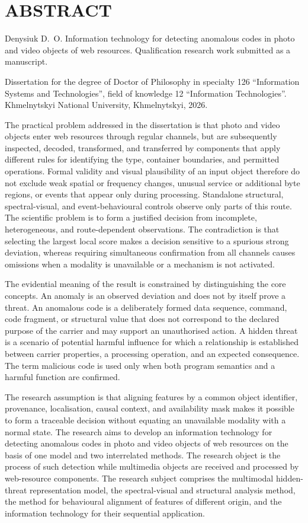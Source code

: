 \chapter*{ABSTRACT}

Denysiuk D.~O. Information technology for detecting anomalous codes in photo and video objects of web resources. Qualification research work submitted as a manuscript.

Dissertation for the degree of Doctor of Philosophy in specialty 126 ``Information Systems and Technologies'', field of knowledge 12 ``Information Technologies''. Khmelnytskyi National University, Khmelnytskyi, 2026.

The practical problem addressed in the dissertation is that photo and video objects enter web resources through regular channels, but are subsequently inspected, decoded, transformed, and transferred by components that apply different rules for identifying the type, container boundaries, and permitted operations. Formal validity and visual plausibility of an input object therefore do not exclude weak spatial or frequency changes, unusual service or additional byte regions, or events that appear only during processing. Standalone structural, spectral-visual, and event-behavioural controls observe only parts of this route. The scientific problem is to form a justified decision from incomplete, heterogeneous, and route-dependent observations. The contradiction is that selecting the largest local score makes a decision sensitive to a spurious strong deviation, whereas requiring simultaneous confirmation from all channels causes omissions when a modality is unavailable or a mechanism is not activated.

The evidential meaning of the result is constrained by distinguishing the core concepts. An anomaly is an observed deviation and does not by itself prove a threat. An anomalous code is a deliberately formed data sequence, command, code fragment, or structural value that does not correspond to the declared purpose of the carrier and may support an unauthorised action. A hidden threat is a scenario of potential harmful influence for which a relationship is established between carrier properties, a processing operation, and an expected consequence. The term malicious code is used only when both program semantics and a harmful function are confirmed.

The research assumption is that aligning features by a common object identifier, provenance, localisation, causal context, and availability mask makes it possible to form a traceable decision without equating an unavailable modality with a normal state. The research aims to develop an information technology for detecting anomalous codes in photo and video objects of web resources on the basis of one model and two interrelated methods. The research object is the process of such detection while multimedia objects are received and processed by web-resource components. The research subject comprises the multimodal hidden-threat representation model, the spectral-visual and structural analysis method, the method for behavioural alignment of features of different origin, and the information technology for their sequential application.

